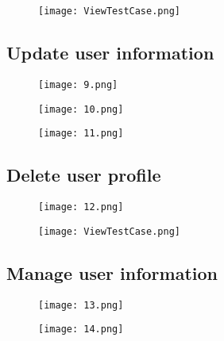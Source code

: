 \documentclass[english]{article}
\begin{document}
\begin{figure}[ht!]
\hspace*{-2.5cm} 
\texttt{[image: ViewTestCase.png]}
\end{figure}

\subsection{Update user information}
\begin{figure}[H]
\hspace*{-2.5cm} 
\texttt{[image: 9.png]}
\end{figure}

\begin{figure}[H]
\hspace*{-2.5cm} 
\texttt{[image: 10.png]}
\end{figure}

\begin{figure}[H]
\hspace*{-2.5cm} 
\texttt{[image: 11.png]}
\end{figure}

\subsection{Delete user profile}
\begin{figure}[ht!]
\hspace*{-2.5cm} 
\texttt{[image: 12.png]}
\end{figure}

\begin{figure}[ht!]
\hspace*{-2.5cm} 
\texttt{[image: ViewTestCase.png]}
\end{figure}

\clearpage

\subsection{Manage user information}
\begin{figure}[ht!]
\hspace*{-2.5cm} 
\texttt{[image: 13.png]}
\end{figure}

\begin{figure}[ht!]
\hspace*{-2.5cm} 
\texttt{[image: 14.png]}
\end{figure}
\end{document}
